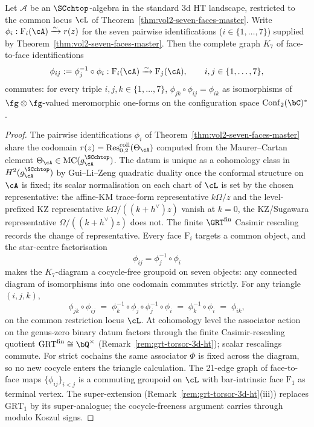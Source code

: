 \begin{proposition}
\label{prop:seven-face-sasaki-commutativity}
Let $\mathcal{A}$ be an $\SCchtop$-algebra in the standard 3d HT
landscape, restricted to the common locus $\cL$ of
Theorem~\ref{thm:vol2-seven-faces-master}. Write
$\phi_i: \mathrm{F}_i(\cA) \xrightarrow{\sim}
r(z)$ for the seven pairwise identifications
\textup{(}$i\in\{1,\dots,7\}$\textup{)} supplied by
Theorem~\ref{thm:vol2-seven-faces-master}. Then the complete graph
$K_7$ of face-to-face identifications
\[
\phi_{ij} := \phi_j^{-1}\circ\phi_i : \mathrm{F}_i(\cA)
\xrightarrow{\sim}\mathrm{F}_j(\cA),
\qquad i,j\in\{1,\dots,7\},
\]
commutes: for every triple $i,j,k\in\{1,\dots,7\}$,
$\phi_{jk}\circ\phi_{ij} = \phi_{ik}$ as isomorphisms of
$\fg\otimes\fg$-valued meromorphic one-forms on the configuration
space $\mathrm{Conf}_2(\bC)^*$.
\end{proposition}

\begin{proof}
The pairwise identifications $\phi_i$ of
Theorem~\ref{thm:vol2-seven-faces-master} share the codomain
$r(z) = \operatorname{Res}^{\mathrm{coll}}_{0,2}(\Theta_\cA)$
computed from the Maurer--Cartan element
$\Theta_\cA\in\mathrm{MC}(g^{\SCchtop}_\cA)$. The datum is unique
as a cohomology class in $H^2(g^{\SCchtop}_\cA)$ by Gui--Li--Zeng
quadratic duality \cite[Thm.~5.2]{GLZ24} once the conformal
structure on $\cA$ is fixed; its scalar normalisation on each
chart of $\cL$ is set by the chosen representative: the
affine-KM trace-form representative $k\Omega/z$ and the
level-prefixed KZ representative $k\Omega/((k+h^\vee)z)$ vanish at
$k=0$, the KZ/Sugawara representative $\Omega/((k+h^\vee)z)$ does
not. The finite $\GRT^{\mathrm{fin}}$ Casimir rescaling records
the change of representative. Every face $\mathrm{F}_i$ targets a
common object, and the star-centre factorisation
\[
\phi_{ij} = \phi_j^{-1}\circ\phi_i
\]
makes the $K_7$-diagram a cocycle-free groupoid on seven objects:
any connected diagram of isomorphisms into one codomain commutes
strictly. For any triangle $(i,j,k)$,
\[
\phi_{jk}\circ\phi_{ij}
\;=\;\phi_k^{-1}\circ\phi_j\circ\phi_j^{-1}\circ\phi_i
\;=\;\phi_k^{-1}\circ\phi_i
\;=\;\phi_{ik},
\]
on the common restriction locus $\cL$. At cohomology level the
associator action on the genus-zero binary datum factors through
the finite Casimir-rescaling quotient
$\mathrm{GRT}^{\mathrm{fin}}\cong\bQ^\times$
(Remark~\ref{rem:grt-torsor-3d-ht}); scalar rescalings commute.
For strict cochains the same associator $\Phi$ is fixed across the
diagram, so no new cocycle enters the triangle calculation. The
21-edge graph of face-to-face maps $\{\phi_{ij}\}_{i<j}$ is a
commuting groupoid on $\cL$ with bar-intrinsic face $\mathrm{F}_1$
as terminal vertex. The super-extension
(Remark~\ref{rem:grt-torsor-3d-ht}(iii)) replaces $\mathrm{GRT}_1$
by its super-analogue; the cocycle-freeness argument carries
through modulo Koszul signs.
\end{proof}

